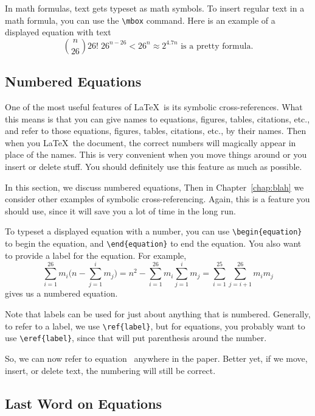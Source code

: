 In math formulas, text gets typeset as math symbols. To
insert regular text in a math formula, you can use the \verb+\mbox+
command. Here is an example of a displayed equation with text
$$
  {n\choose 26} 26!\;  26^{n-26} < 26^n \approx 2^{4.7n} \mbox{ is a pretty formula} .
$$ 


\subsection{Numbered Equations}

One of the most useful features of \LaTeX\ is its symbolic cross-references.
What this means is that you can give names to equations, figures, tables, citations, etc., and
refer to those equations, figures, tables, citations, etc., by their names. Then when you \LaTeX\
the document, the correct numbers will magically appear in place of the
names. This is very convenient when you move things around or you insert or delete
stuff. You should definitely use this feature as much as possible.

In this section, we discuss numbered equations, Then in Chapter~\ref{chap:blah}
we consider other examples of symbolic cross-referencing.
Again, this is a feature you should use, since it will save
you a lot of time in the long run.

To typeset a displayed equation with a number, you can 
use \verb+\begin{equation}+ to begin the equation, and \verb+\end{equation}+
to end the equation. You also want to provide a label for the equation.
For example,
\begin{equation}\label{eq:swaps}
  \sum_{i = 1}^{26} m_i \bigg( n - \sum_{j=1}^i m_j \bigg) 
    = n^2 - \sum_{i = 1}^{26} m_i  \sum_{j=1}^i m_j = \sum_{i=1}^{25} \sum_{j=i+1}^{26} m_i m_j 
\end{equation}
gives us a numbered equation. 

Note that labels can be used for
just about anything that is numbered. Generally, to refer to a label,
we use \verb+\ref{label}+, but for equations, you probably want to use
\verb+\eref{label}+, since that will put parenthesis around the number.

So, we can now refer to equation~ anywhere in the paper.
Better yet, if we move, insert, or delete text, the numbering will still be correct.


\subsection{Last Word on Equations}

